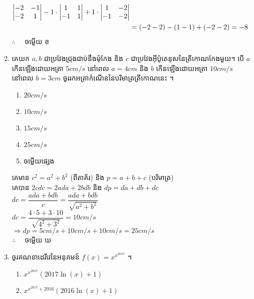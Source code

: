\documentclass[a4paper,12pt]{article}
\begin{document}
\begin{enumerate}[m]
\begin{center}
\begin{eqnarray*}
				\begin{vmatrix}
					-2 & -1\\ 
					-2 & 1 \notag
				\end{vmatrix}
				-1\cdot
				\begin{vmatrix}
					1 & 1\\ 
					-1 & 1 \notag
				\end{vmatrix}
				+1\cdot
				\begin{vmatrix}
					1 & -2\\ 
					-1 & -2 \notag
				\end{vmatrix}\\
				&=\left(-2-2\right)-\left(1-1\right)+\left(-2-2\right)=-8\\
		\end{eqnarray*}
		$\therefore \quad$ \kml ចម្លើយ \kbk ខ
	\end{center}
	{\color{blue}\hrulefill}
	\item គេយក $a,b$ ជាប្រវែងជ្រុងជាប់នឹងមុំកែង និង $c$ ជាប្រវែងអ៊ីប៉ូតេនុសនៃត្រីកោណកែងមួយ។ បើ $a$ កើនឡើងដោយអត្រា $5 cm/s$ នៅពេល $a=4cm$ និង $b$ កើនឡើងដោយអត្រា $10 cm/s$ នៅពេល $b=3cm$ ចូររកអត្រាកំណើននៃបរិមាត្រត្រីកោណនេះ ។
	\begin{enumerate}[k,5]
		\item $20 cm/s$
		\item $10 cm/s$
		\item $15 cm/s$
		\item $25 cm/s$
		\item ចម្លើយផ្សេង
	\end{enumerate}
	\answer
	\begin{center}
		គេមាន $c^2=a^2+b^2$ (ពីតាគ័រ) និង $p=a+b+c$ (បរិមាត្រ)\\
		គេបាន $2cdc=2ada+2bdb$ និង $dp=da+db+dc$\\
		$dc=\dfrac{ada+bdb}{c}=\dfrac{ada+bdb}{\sqrt{a^2+b^2}}$\\
		$dc=\dfrac{4\cdot5+3\cdot10}{\sqrt{4^2+3^2}}=10cm/s$\\
		$\Rightarrow dp=5cm/s+10cm/s+10cm/s=25cm/s$\\
		$\therefore \quad$ \kml ចម្លើយ \kbk ឃ
	\end{center}
	{\color{blue}\hrulefill}
	\item ចូរគណនាដេរីវេនៃអនុគមន៍ $f(x)=x^{x^{2017}}$ ។
		\begin{enumerate}[k,2]
			\item $x^{x^{2017}}\left(2017\ln\left(x\right)+1\right)$
			\item $x^{x^{2017}+2016}\left(2016\ln\left(x\right)+1\right)$

\end{enumerate}
\end{enumerate}
\end{document}
